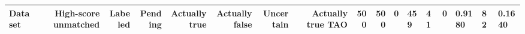 \begin{tabular}{lrrrrrrrrr}
\toprule
Dataset & High-score unmatched & Labeled & Pending & Actually true & Actually false & Uncertain & Actually true %
\midrule
TAO & 500 & 500 & 0 & 459 & 41 & 0 & 0.9180 & 82 & 0.1640 \\
\bottomrule
\end{tabular}
